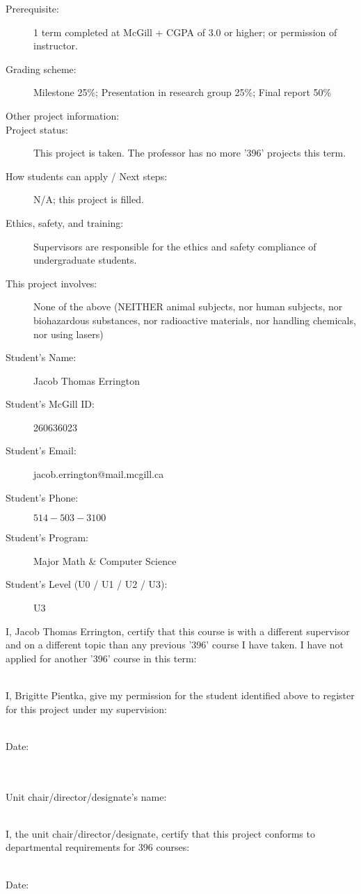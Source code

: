\documentclass[8pt,letterpaper]{article}
\begin{document}
\begin{description}
    \item[Prerequisite:] 1 term completed at McGill + CGPA of 3.0 or higher; or
        permission of instructor.
    \item[Grading scheme:]
        Milestone 25\%; Presentation in research group 25\%; Final report 50\%
    \item[Other project information:]
    \item[Project status:] This project is taken. The professor has no more
        '396' projects this term.
    \item[How students can apply / Next steps:] N/A; this project is filled.
    \item[Ethics, safety, and training:] Supervisors are responsible for the
        ethics and safety compliance of undergraduate students.
    \item[This project involves:] None of the above (NEITHER animal subjects,
        nor human subjects, nor biohazardous substances, nor radioactive
        materials, nor handling chemicals, nor using lasers)
\end{description}

\newpage

\begin{description}
    \item[Student's Name:] Jacob Thomas Errington
    \item[Student's McGill ID:] 260636023
    \item[Student's Email:] jacob.errington@mail.mcgill.ca
    \item[Student's Phone:] $514-503-3100$
    \item[Student's Program:] Major Math \& Computer Science
    \item[Student's Level (U0 / U1 / U2 / U3):] U3
\end{description}

I, Jacob Thomas Errington, certify that this course is with a different
supervisor and on a different topic than any previous '396' course I have
taken. I have not applied for another '396' course in this term:

~\\

I, Brigitte Pientka, give my permission for the student identified
above to register for this project under my supervision:

~\\

Date:

~\\
~\\

Unit chair/director/designate's name:

~\\

I, the unit chair/director/designate, certify that this project conforms to
departmental requirements for 396 courses:

~\\

Date:
\end{document}
